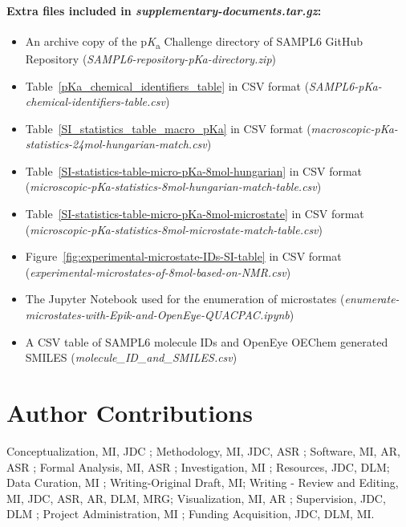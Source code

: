 \documentclass[9pt,lineno,final]{elife}
\newcommand{\pKa}{p\textit{K}\textsubscript{a}}
\begin{document}
\paragraph{Extra files included in \textit{supplementary-documents.tar.gz}:}  
\begin{itemize}
\item An archive copy of the \pKa{} Challenge directory of SAMPL6 GitHub Repository (\textit{SAMPL6-repository-pKa-directory.zip}) 
\item Table~\ref{pKa_chemical_identifiers_table} in CSV format (\textit{SAMPL6-pKa-chemical-identifiers-table.csv}) 
\item Table~\ref{SI_statistics_table_macro_pKa} in CSV format (\textit{macroscopic-pKa-statistics-24mol-hungarian-match.csv})
\item Table~\ref{SI-statistics-table-micro-pKa-8mol-hungarian} in CSV format (\textit{microscopic-pKa-statistics-8mol-hungarian-match-table.csv})
\item Table~\ref{SI-statistics-table-micro-pKa-8mol-microstate} in CSV format (\textit{microscopic-pKa-statistics-8mol-microstate-match-table.csv})
\item Figure~\ref{fig:experimental-microstate-IDs-SI-table} in CSV format (\textit{experimental-microstates-of-8mol-based-on-NMR.csv})
\item The Jupyter Notebook used for the enumeration of microstates (\textit{enumerate-microstates-with-Epik-and-OpenEye-QUACPAC.ipynb})
\item A CSV table of SAMPL6 molecule IDs and OpenEye OEChem generated SMILES (\textit{molecule\_ID\_and\_SMILES.csv})

\end{itemize}


\section{Author Contributions}

Conceptualization, MI, JDC ; Methodology, MI, JDC, ASR ; Software, MI, AR, ASR ; Formal Analysis, MI, ASR ; Investigation, MI ; Resources, JDC, DLM;  Data Curation, MI ; Writing-Original Draft, MI; Writing - Review and Editing, MI, JDC, ASR, AR, DLM, MRG; Visualization, MI, AR ; Supervision, JDC, DLM ; Project Administration, MI ; Funding Acquisition, JDC, DLM, MI.

\end{document}
